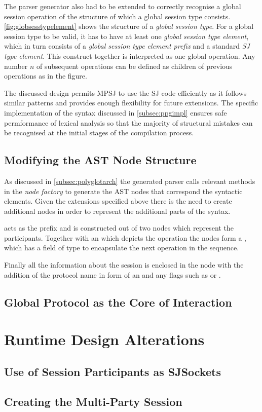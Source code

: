 The parser generator also had to be extended to correctly recognise a global session operation of the structure  of which a global session type consists. \autoref{fig:globsesstypelement} shows the structure of a \textit{global session type}. For a global session type to be valid, it has to have at least one \textit{global session type element}, which in turn consists of a \textit{global session type element prefix} and a standard \textit{SJ type element}. This construct together is interpreted as one global operation. Any number $n$ of subsequent operations can be defined as children of previous operations as in the figure. 

The discussed design permits MPSJ to use the SJ code efficiently as it follows similar patterns and provides enough flexibility for future extensions. The specific implementation of the syntax discussed in \autoref{subsec:ppgimpl} ensures safe permformance of lexical analysis so that the majority of structural mistakes can be recognised at the initial stages of the compilation process.


\subsection{Modifying the AST Node Structure}

As discussed in \autoref{subsec:polyglotarch} the generated parser calls relevant methods in the \textit{node factory} to generate the AST nodes that correspond the syntactic elements. Given the extensions specified above there is the need to create additional nodes in order to represent the additional parts of the syntax.

 acts as the prefix and is constructed out of two  nodes which represent the participants. Together with an  which depicts the operation the nodes form a , which has a field  of type  to encapsulate the next operation in the sequence.

Finally all the information about the session is enclosed in the  node with the addition of the protocol name in form of an  and any flags such as  or . 

\subsection{Global Protocol as the Core of Interaction}






\section{Runtime Design Alterations}

\subsection{Use of Session Participants as SJSockets}

\subsection{Creating the Multi-Party Session}